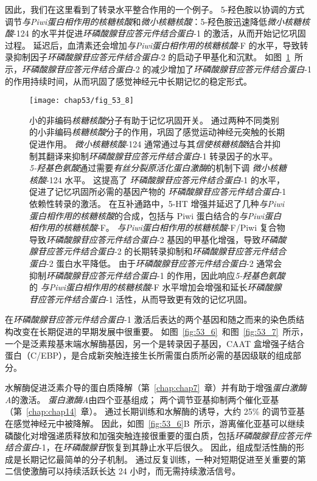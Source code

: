 因此，我们在这里看到了转录水平整合作用的一个例子。
5-羟色胺以协调的方式调节\textit{与Piwi蛋白相作用的核糖核酸}和\textit{微小核糖核酸}：5-羟色胺迅速降低\textit{微小核糖核酸}-124 的水平并促进\textit{环磷酸腺苷应答元件结合蛋白}-1 的激活，从而开始记忆巩固过程。
延迟后，血清素还会增加\textit{与Piwi蛋白相作用的核糖核酸}-F 的水平，导致转录抑制因子\textit{环磷酸腺苷应答元件结合蛋白}-2 的启动子甲基化和沉默。
如图~\ref{fig:53_8}~所示，\textit{环磷酸腺苷应答元件结合蛋白}-2 的减少增加了\textit{环磷酸腺苷应答元件结合蛋白}-1 的作用持续时间，从而巩固了感觉神经元中长期记忆的稳定形式。


\begin{figure}[htbp]
	\centering
	\texttt{[image: chap53/fig\_53\_8]}
	\caption{小的非编码\textit{核糖核酸}分子有助于记忆巩固开关。
		通过两种不同类别的小非编码\textit{核糖核酸}分子的作用，巩固了感觉运动神经元突触的长期促进作用。
		\textit{微小核糖核酸}-124 通常通过与其\textit{信使核糖核酸}结合并抑制其翻译来抑制\textit{环磷酸腺苷应答元件结合蛋白}-1 转录因子的水平。
		\textit{5-羟基色氨酸}通过需要\textit{有丝分裂原活化蛋白激酶}的机制下调 \textit{微小核糖核酸}-124 水平。
		这提高了 \textit{环磷酸腺苷应答元件结合蛋白}-1 的水平，促进了记忆巩固所必需的基因产物的 \textit{环磷酸腺苷应答元件结合蛋白}-1 依赖性转录的激活。
		在互补通路中，5-HT 增强并延迟了几种\textit{与Piwi蛋白相作用的核糖核酸}的合成，包括与 Piwi 蛋白结合的\textit{与Piwi蛋白相作用的核糖核酸}-F。
		\textit{与Piwi蛋白相作用的核糖核酸}-F/Piwi 复合物导致\textit{环磷酸腺苷应答元件结合蛋白}-2 基因的甲基化增强，导致\textit{环磷酸腺苷应答元件结合蛋白}-2 的长期转录抑制和\textit{环磷酸腺苷应答元件结合蛋白}-2 蛋白水平降低。
		由于\textit{环磷酸腺苷应答元件结合蛋白}-2 通常会抑制\textit{环磷酸腺苷应答元件结合蛋白}-1 的作用，因此响应\textit{5-羟基色氨酸}的 \textit{与Piwi蛋白相作用的核糖核酸}-F 水平增加会增强和延长\textit{环磷酸腺苷应答元件结合蛋白}-1 活性，从而导致更有效的记忆巩固。}
	\label{fig:53_8}
\end{figure}


在\textit{环磷酸腺苷应答元件结合蛋白}-1 激活后表达的两个基因和随之而来的染色质结构改变在长期促进的早期发展中很重要。
如图~\ref{fig:53_6}~和图~\ref{fig:53_7}~所示，一个是泛素羧基末端水解酶基因，另一个是转录因子基因，CAAT 盒增强子结合蛋白（C/EBP），是合成新突触连接生长所需蛋白质所必需的基因级联的组成部分。


水解酶促进泛素介导的蛋白质降解（第~\ref{chap:chap7}~章）并有助于增强\textit{蛋白激酶A}的激活。
\textit{蛋白激酶A}由四个亚基组成；
两个调节亚基抑制两个催化亚基（第~\ref{chap:chap14}~章）。
通过长期训练和水解酶的诱导，大约 25\% 的调节亚基在感觉神经元中被降解。
因此，如图~\ref{fig:53_6}B~所示，游离催化亚基可以继续磷酸化对增强递质释放和加强突触连接很重要的蛋白质，包括\textit{环磷酸腺苷应答元件结合蛋白}-1，在\textit{环磷酸腺苷}恢复到其静止水平后很久。
因此，组成型活性酶的形成是长期记忆最简单的分子机制。
通过反复训练，一种对短期促进至关重要的第二信使激酶可以持续活跃长达 24 小时，而无需持续激活信号。


